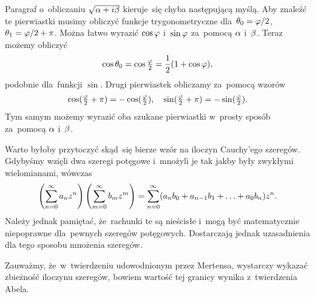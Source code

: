 \documentclass[a4paper,11pt]{article}
\begin{document}
\vspace{\spaceFour}


\start {} Paragraf o~obliczaniu $\sqrt{ \alpha + i \beta }$
kieruje~się chyba następującą myślą. Aby znaleźć te pierwiastki musimy
obliczyć funkcje trygonometryczne dla~$\theta_{ 0 } = \varphi / 2$,
$\theta_{ 1 } = \varphi / 2 + \pi$. Można łatwo wyrazić $\cos \varphi$
i~$\sin \varphi$ za~pomocą $\alpha$ i~$\beta$. Teraz możemy obliczyć
\begin{equation}
  \label{eq:Leja-6}
  \begin{split}
    \cos \theta_{ 0 } = \cos \tfrac{ \varphi }{ 2 } = \frac{ 1 }{ 2 } ( 1 + \cos
    \varphi ),
  \end{split}
\end{equation}
podobnie dla~funkcji $\sin$. Drugi pierwiastek obliczamy za~pomocą
wzorów
\begin{equation}
  \label{eq:Leja-7}
  \begin{split}
    \cos( \tfrac{ \varphi }{ 2 } + \pi ) = -\cos( \tfrac{ \varphi }{ 2 } ), \quad
    \sin( \tfrac{ \varphi }{ 2 } + \pi ) = -\sin( \tfrac{ \varphi }{ 2 } ).
  \end{split}
\end{equation}
Tym samym możemy wyrazić oba szukane pierwiastki w~prosty sposób
za~pomocą $\alpha$ i~$\beta$.

\vspace{\spaceFour}


\start {} Warto byłoby przytoczyć skąd~się bierze wzór na
iloczyn Cauchy'ego szeregów. Gdybyśmy wzięli dwa szeregi potęgowe
i~mnożyli je tak jakby były zwykłymi wielomianami, wówczas
\begin{equation}
  \label{eq:Leja-8}
  \begin{split}
    \left( \sum\limits_{ n = 0 }^{ \infty } a_{ n } z^{ n } \right) \left(
      \sum\limits_{ m = 0 }^{ \infty } b_{ m } z^{ m } \right) = \sum\limits_{ n = 0
    }^{ \infty } ( a_{ n } b_{ 0 } + a_{ n - 1 } b_{ 1 } + \ldots + a_{ 0
    } b_{ n } ) z^{ n }.
  \end{split}
\end{equation}
Należy jednak pamiętać, że~rachunki te są nieścisłe i~mogą być
matematycznie niepoprawne dla~pewnych szeregów potęgowych. Dostarczają
jednak uzasadnienia dla tego sposobu mnożenia szeregów.

\vspace{\spaceFour}


\start {} Zauważmy, że~w~twierdzeniu udowodnionym przez
Mertensa, wystarczy wykazać zbieżność iloczynu szeregów, bowiem
wartość tej granicy wynika z~twierdzenia Abela.
\end{document}
